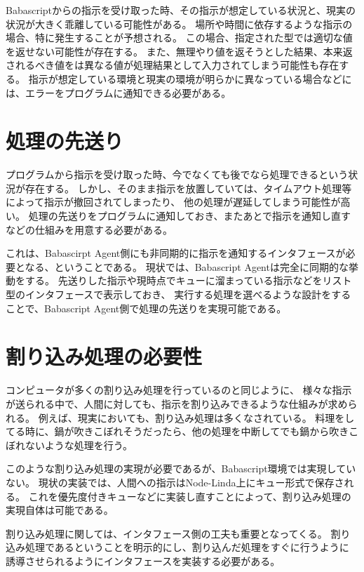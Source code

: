 Babascriptからの指示を受け取った時、その指示が想定している状況と、現実の状況が大きく乖離している可能性がある。
場所や時間に依存するような指示の場合、特に発生することが予想される。
この場合、指定された型では適切な値を返せない可能性が存在する。
また、無理やり値を返そうとした結果、本来返されるべき値をは異なる値が処理結果として入力されてしまう可能性も存在する。
指示が想定している環境と現実の環境が明らかに異なっている場合などには、エラーをプログラムに通知できる必要がある。

\section{処理の先送り}\label{ux51e6ux7406ux306eux5148ux9001ux308a}

プログラムから指示を受け取った時、今でなくても後でなら処理できるという状況が存在する。
しかし、そのまま指示を放置していては、タイムアウト処理等によって指示が撤回されてしまったり、
他の処理が遅延してしまう可能性が高い。
処理の先送りをプログラムに通知しておき、またあとで指示を通知し直すなどの仕組みを用意する必要がある。

これは、Babascirpt
Agent側にも非同期的に指示を通知するインタフェースが必要となる、ということである。
現状では、Babascript Agentは完全に同期的な挙動をする。
先送りした指示や現時点でキューに溜まっている指示などをリスト型のインタフェースで表示しておき、
実行する処理を選べるような設計をすることで、Babascript
Agent側で処理の先送りを実現可能である。

\section{割り込み処理の必要性}\label{ux5272ux308aux8fbcux307fux51e6ux7406ux306eux5fc5ux8981ux6027}

コンピュータが多くの割り込み処理を行っているのと同じように、
様々な指示が送られる中で、人間に対しても、指示を割り込みできるような仕組みが求められる。
例えば、現実においても、割り込み処理は多くなされている。
料理をしてる時に、鍋が吹きこぼれそうだったら、他の処理を中断してでも鍋から吹きこぼれないような処理を行う。

このような割り込み処理の実現が必要であるが、Babascript環境では実現していない。
現状の実装では、人間への指示はNode-Linda上にキュー形式で保存される。
これを優先度付きキューなどに実装し直すことによって、割り込み処理の実現自体は可能である。

割り込み処理に関しては、インタフェース側の工夫も重要となってくる。
割り込み処理であるということを明示的にし、割り込んだ処理をすぐに行うように
誘導させられるようにインタフェースを実装する必要がある。

